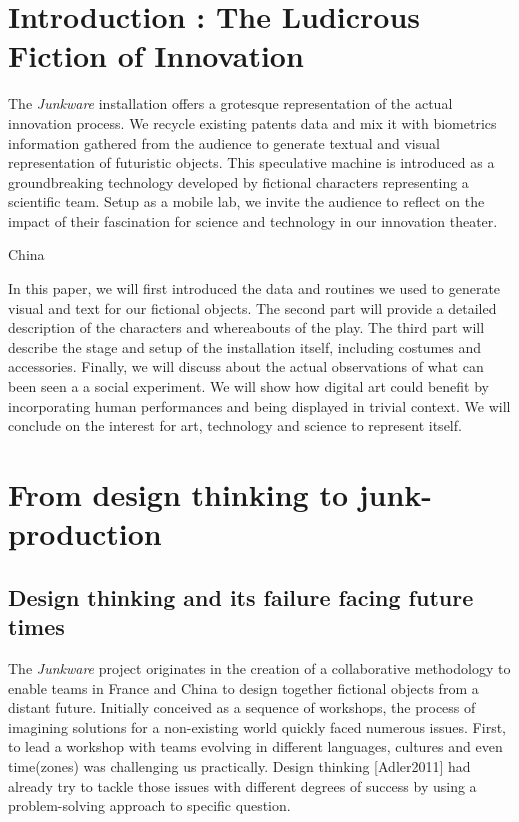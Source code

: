 \clearpage
\section{Introduction : The Ludicrous Fiction of Innovation}

\bigskip

The \textit{Junkware }installation offers a grotesque representation of
the actual innovation process. We recycle existing patents data and mix
it with biometrics information gathered from the audience to generate
textual and visual representation of futuristic objects. This
speculative machine is introduced as a groundbreaking technology
developed by fictional characters representing a scientific team. Setup
as a mobile lab, we invite the audience to reflect on the impact of
their fascination for science and technology in our innovation theater.

China


\bigskip

In this paper, we will first introduced the data and routines we used to
generate visual and text for our fictional objects. The second part
will provide a detailed description of the characters and whereabouts
of the play. The third part will describe the stage and setup of the
installation itself, including costumes and accessories. Finally, we
will discuss about the actual observations of what can been seen a a
social experiment. We will show how digital art could benefit by
incorporating human performances and being displayed in trivial
context. We will conclude on the interest for art, technology and
science to represent itself.


\section{From design thinking to junk-production}
\subsection{Design thinking and its failure facing future times }
The \textit{Junkware} project originates in the creation of a
collaborative methodology to enable teams in France and China to design
together fictional objects from a distant future. Initially conceived
as a sequence of workshops, the process of imagining solutions for a
non-existing world quickly faced numerous issues. First, to lead a
workshop with teams evolving in different languages, cultures and even
time(zones) was challenging us practically. Design thinking [Adler2011]
had already try to tackle those issues with different degrees of
success by using a problem-solving approach to specific question. 


